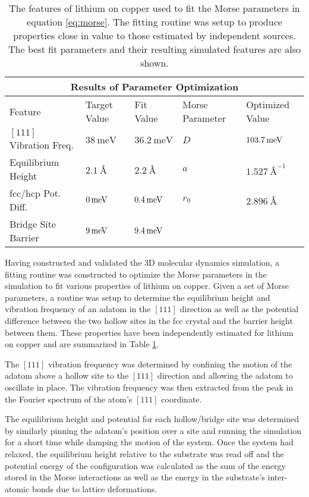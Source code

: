 \begin{table}[h!]
	\centering
\begin{tabular}{ |p{3.5cm}|p{2.2cm}|p{1.8cm}||p{2.8cm}|p{2.8cm}|}
 \hline
 \multicolumn{5}{|c|}{Results of Parameter Optimization} \\
 \hline
	Feature & Target Value & Fit Value & Morse Parameter & Optimized Value \\
 \hline
	$\left[111\right]$ Vibration Freq. & $\SI{38}{\milli\eV}$ \cite{livibfreq} & $\SI{36.2}{\milli\eV}$ & $D$ & $\SI{103.7}{\mev}$ \\
	Equilibrium Height & $\SI{2.1}{\angstrom}$ \cite{PADILLACAMPOS1997183} & $\SI{2.2}{\angstrom}$ & $a$ & $\SI{1.527}{\angstrom}^{-1}$ \\
	fcc/hcp Pot. Diff. & $\SI{0}{\mev}$ \cite{Guido,Ward} & $\SI{0.4}{\mev}$ & $r_0$ & $\SI{2.896}{\angstrom}$ \\
	Bridge Site Barrier & $\SI{9}{\mev}$ \cite{PADILLACAMPOS1997183, Ward} & $\SI{9.4}{\mev}$ & & \\
 \hline
\end{tabular}
	\caption{The features of lithium on copper used to fit the Morse parameters in equation \ref{eq:morse}. The fitting routine was setup to produce properties close in value to those estimated by independent sources. The best fit parameters and their resulting simulated features are also shown.} 
\label{table:fit_parameters}
\end{table}

Having constructed and validated the 3D molecular dynamics simulation, a fitting routine was constructed to optimize the Morse parameters in the simulation to fit various properties of lithium on copper. Given a set of Morse parameters, a routine was setup to determine the equilibrium height and vibration frequency of an adatom in the $\left[111\right]$ direction as well as the potential difference between the two hollow sites in the fcc crystal and the barrier height between them. These properties have been independently estimated for lithium on copper and are summarized in Table \ref{table:fit_parameters}. 

The $\left[111\right]$ vibration frequency was determined by confining the motion of the adatom above a hollow site to the $\left[111\right]$ direction and allowing the adatom to oscillate in place. The vibration frequency was then extracted from the peak in the Fourier spectrum of the atom's $\left[111\right]$ coordinate.

The equilibrium height and potential for each hollow/bridge site was determined by similarly pinning the adatom's position over a site and running the simulation for a short time while damping the motion of the system. Once the system had relaxed, the equilibrium height relative to the substrate was read off and the potential energy of the configuration was calculated as the sum of the energy stored in the Morse interactions as well as the energy in the substrate's inter-atomic bonds due to lattice deformations.

